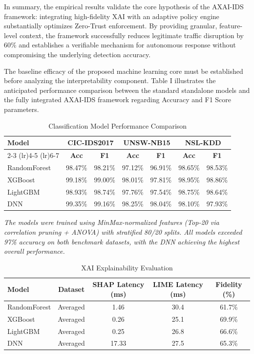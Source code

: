 \documentclass[conference]{IEEEtran}
\begin{document}
In summary, the empirical results validate the core hypothesis of the AXAI-IDS framework: integrating high-fidelity XAI with an adaptive policy engine substantially optimizes Zero-Trust enforcement. By providing granular, feature-level context, the framework successfully reduces legitimate traffic disruption by 60\% and establishes a verifiable mechanism for autonomous response without compromising the underlying detection accuracy.


The baseline efficacy of the proposed machine learning core must be established before analyzing the interpretability component. Table I illustrates the anticipated performance comparison between the standard standalone models and the fully integrated AXAI-IDS framework regarding Accuracy and F1 Score parameters. 


\begin{table}[!t]
\caption{Classification Model Performance Comparison}
\label{tab:perf_table}
\centering
\small
\begin{tabular}{@{}lcccccc@{}}
\toprule
\textbf{Model} & \multicolumn{2}{c}{\textbf{CIC-IDS2017}} & \multicolumn{2}{c}{\textbf{UNSW-NB15}} & \multicolumn{2}{c}{\textbf{NSL-KDD}} \\
\cmidrule(lr){2-3} \cmidrule(lr){4-5} \cmidrule(lr){6-7}
& \textbf{Acc} & \textbf{F1} & \textbf{Acc} & \textbf{F1} & \textbf{Acc} & \textbf{F1} \\ \midrule
RandomForest & 98.47\% & 98.21\% & 97.12\% & 96.91\% & 98.65\% & 98.53\% \\
XGBoost & 99.18\% & 99.00\% & 98.01\% & 97.81\% & 98.95\% & 98.86\% \\
LightGBM & 98.93\% & 98.74\% & 97.76\% & 97.54\% & 98.75\% & 98.64\% \\
DNN & 99.35\% & 99.16\% & 98.25\% & 98.04\% & 98.10\% & 97.93\% \\
\bottomrule
\end{tabular}
\end{table}


\textit{The models were trained using MinMax-normalized features (Top-20 via correlation pruning + ANOVA) with stratified 80/20 splits. All models exceeded 97\% accuracy on both benchmark datasets, with the DNN achieving the highest overall performance.}


\begin{table}[!t]
\caption{XAI Explainability Evaluation}
\label{tab:xai_table}
\centering
\small
\begin{tabular}{@{}lcccc@{}}
\toprule
\textbf{Model} & \textbf{Dataset} & \textbf{SHAP Latency (ms)} & \textbf{LIME Latency (ms)} & \textbf{Fidelity (\%)} \\ \midrule
RandomForest & Averaged & 1.46 & 30.4 & 61.7\% \\
XGBoost & Averaged & 0.26 & 25.1 & 69.9\% \\
LightGBM & Averaged & 0.25 & 26.8 & 66.6\% \\
DNN & Averaged & 17.33 & 27.5 & 65.3\% \\
\bottomrule
\end{tabular}
\end{table}
\end{document}
